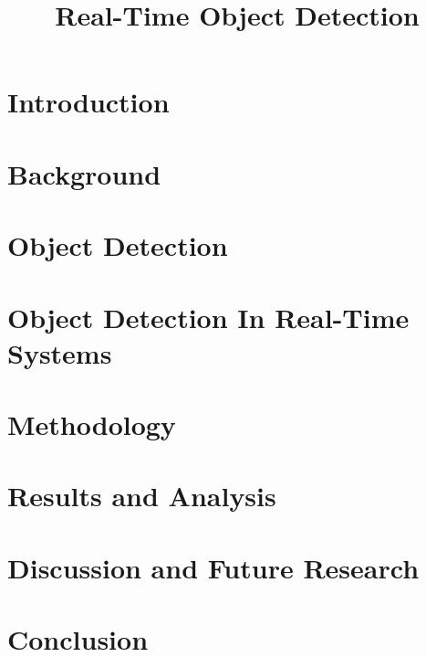 \documentclass[conference]{IEEEtran}
\begin{document}
\title{Real-Time Object Detection}

\author{
}

\maketitle

\begin{abstract}

\end{abstract}

\begin{IEEEkeywords}

\end{IEEEkeywords}

\section{Introduction}
\section{Background}
\section{Object Detection}
\section{Object Detection In Real-Time Systems}
\section{Methodology}
\section{Results and Analysis}
\section{Discussion and Future Research}
\section{Conclusion}

\begin{thebibliography}{00}
\end{thebibliography}
\end{document}
